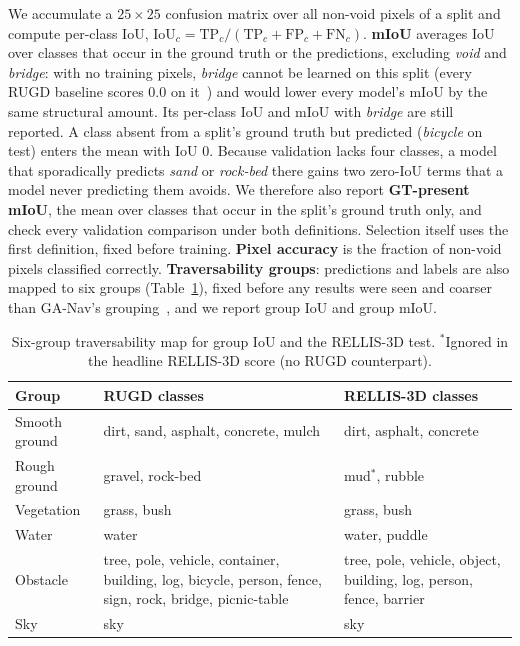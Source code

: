 We accumulate a $25\times25$ confusion matrix over all non-void pixels of a
split and compute per-class IoU, $\mathrm{IoU}_c =
\mathrm{TP}_c/(\mathrm{TP}_c+\mathrm{FP}_c+\mathrm{FN}_c)$. \textbf{mIoU}
averages IoU over classes that occur in the ground truth or the predictions,
excluding \emph{void} and \emph{bridge}: with no training pixels, \emph{bridge}
cannot be learned on this split (every RUGD baseline scores 0.0 on
it~\cite{wigness2019rugd}) and would lower every model's mIoU by the same
structural amount. Its per-class IoU and mIoU with \emph{bridge} are still
reported. A class absent from a
split's ground truth but predicted (\eg\emph{bicycle} on test) enters the mean
with IoU 0. Because validation lacks four classes, a model that sporadically
predicts \emph{sand} or \emph{rock-bed} there gains two zero-IoU terms that a
model never predicting them avoids. We therefore also report
\textbf{GT-present mIoU}, the mean over classes that occur in the split's
ground truth only, and check every validation comparison under both
definitions. Selection itself uses the first definition, fixed before
training. \textbf{Pixel accuracy} is the fraction of non-void pixels
classified correctly. \textbf{Traversability groups}: predictions and labels
are also mapped to six groups (Table~\ref{tab:groups}), fixed before any
results were seen and coarser than GA-Nav's grouping~\cite{guan2022ganav}, and
we report group IoU and group mIoU.

\begin{table}[t]
  \centering
  \caption{Six-group traversability map for group IoU and the RELLIS-3D test.
  $^\ast$Ignored in the headline RELLIS-3D score (no RUGD counterpart).}
  \label{tab:groups}
  \footnotesize
  \setlength{\tabcolsep}{4pt}
  \begin{tabular}{@{}l p{3.15cm} p{2.55cm}@{}}
    \toprule
    Group & RUGD classes & RELLIS-3D classes \\
    \midrule
    Smooth ground & dirt, sand, asphalt, concrete, mulch & dirt, asphalt, concrete \\
    Rough ground  & gravel, rock-bed & mud$^\ast$, rubble \\
    Vegetation    & grass, bush & grass, bush \\
    Water         & water & water, puddle \\
    Obstacle      & tree, pole, vehicle, container, building, log, bicycle, person, fence, sign, rock, bridge, picnic-table
                  & tree, pole, vehicle, object, building, log, person, fence, barrier \\
    Sky           & sky & sky \\
    \bottomrule
  \end{tabular}
\end{table}

